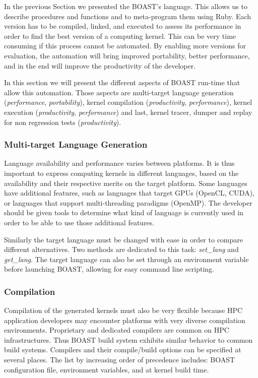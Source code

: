 \documentclass{IEEEtran}
\begin{document}
In the previous Section we presented the BOAST's language. This allows us to
describe procedures and functions and to meta-program them using Ruby.  Each
version has to be compiled, linked, and executed to assess its performance in
order to find the best version of a computing kernel.  This can be very time
consuming if this process cannot be automated. By enabling more versions for
evaluation, the automation will bring improved portability, better performance,
and in the end will improve the productivity of the developer.

In this section we will present the different aspects of BOAST run-time that
allow this automation. Those aspects are multi-target language generation
(\emph{performance}, \emph{portability}), kernel compilation
(\emph{productivity}, \emph{performance}), kernel execution
(\emph{productivity}, \emph{performance}) and last, kernel tracer, dumper and
replay for non regression tests (\emph{productivity}).

\subsubsection{Multi-target Language Generation\label{sec:multitarget}}
Language availability and performance varies between platforms. It is thus
important to express computing kernels in different languages, based on the
availability and their respective merits on the target platform. Some languages
have additional features, such as languages that target GPUs (OpenCL, CUDA), or
languages that support multi-threading paradigms (OpenMP). The developer should be
given tools to determine what kind of language is currently used in order to be
able to use those additional features.

Similarly the target language must be changed with ease in order to compare
different alternatives. Two methods are dedicated to this task: \emph{set\_lang}
and \emph{get\_lang}. The target language can also be set through an environment
variable before launching BOAST, allowing for easy command line scripting.

\subsubsection{Compilation}
Compilation of the generated kernels must also be very flexible because HPC
application developers may encounter platforms with very diverse compilation
environments.  Proprietary and dedicated compilers are common on HPC
infrastructures. Thus BOAST build system exhibits similar behavior to common
build systems. Compilers and their compile/build options can be specified at
several places. The list by increasing order of precedence includes: BOAST
configuration file, environment variables, and at kernel build time.
\end{document}
